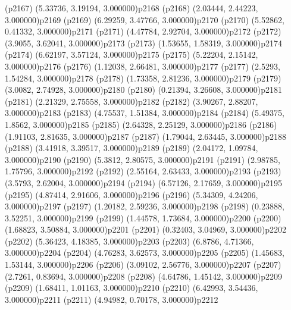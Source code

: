 \psdot(p2167)
\psPoint(5.33736, 3.19194, 3.000000){p2168}
\psdot(p2168)
\psPoint(2.03444, 2.44223, 3.000000){p2169}
\psdot(p2169)
\psPoint(6.29259, 3.47766, 3.000000){p2170}
\psdot(p2170)
\psPoint(5.52862, 0.41332, 3.000000){p2171}
\psdot(p2171)
\psPoint(4.47784, 2.92704, 3.000000){p2172}
\psdot(p2172)
\psPoint(3.9055, 3.62041, 3.000000){p2173}
\psdot(p2173)
\psPoint(1.53655, 1.58319, 3.000000){p2174}
\psdot(p2174)
\psPoint(6.62197, 3.57124, 3.000000){p2175}
\psdot(p2175)
\psPoint(5.22204, 2.15142, 3.000000){p2176}
\psdot(p2176)
\psPoint(1.12038, 2.66481, 3.000000){p2177}
\psdot(p2177)
\psPoint(2.5293, 1.54284, 3.000000){p2178}
\psdot(p2178)
\psPoint(1.73358, 2.81236, 3.000000){p2179}
\psdot(p2179)
\psPoint(3.0082, 2.74928, 3.000000){p2180}
\psdot(p2180)
\psPoint(0.21394, 3.26608, 3.000000){p2181}
\psdot(p2181)
\psPoint(2.21329, 2.75558, 3.000000){p2182}
\psdot(p2182)
\psPoint(3.90267, 2.88207, 3.000000){p2183}
\psdot(p2183)
\psPoint(4.75537, 1.51384, 3.000000){p2184}
\psdot(p2184)
\psPoint(5.49375, 1.8562, 3.000000){p2185}
\psdot(p2185)
\psPoint(2.64328, 2.25129, 3.000000){p2186}
\psdot(p2186)
\psPoint(1.91103, 2.81635, 3.000000){p2187}
\psdot(p2187)
\psPoint(1.79044, 2.63445, 3.000000){p2188}
\psdot(p2188)
\psPoint(3.41918, 3.39517, 3.000000){p2189}
\psdot(p2189)
\psPoint(2.04172, 1.09784, 3.000000){p2190}
\psdot(p2190)
\psPoint(5.3812, 2.80575, 3.000000){p2191}
\psdot(p2191)
\psPoint(2.98785, 1.75796, 3.000000){p2192}
\psdot(p2192)
\psPoint(2.55164, 2.63433, 3.000000){p2193}
\psdot(p2193)
\psPoint(3.5793, 2.62004, 3.000000){p2194}
\psdot(p2194)
\psPoint(6.57126, 2.17659, 3.000000){p2195}
\psdot(p2195)
\psPoint(4.87414, 2.91606, 3.000000){p2196}
\psdot(p2196)
\psPoint(5.34309, 4.24206, 3.000000){p2197}
\psdot(p2197)
\psPoint(1.20182, 2.59236, 3.000000){p2198}
\psdot(p2198)
\psPoint(0.23888, 3.52251, 3.000000){p2199}
\psdot(p2199)
\psPoint(1.44578, 1.73684, 3.000000){p2200}
\psdot(p2200)
\psPoint(1.68823, 3.50884, 3.000000){p2201}
\psdot(p2201)
\psPoint(0.32403, 3.04969, 3.000000){p2202}
\psdot(p2202)
\psPoint(5.36423, 4.18385, 3.000000){p2203}
\psdot(p2203)
\psPoint(6.8786, 4.71366, 3.000000){p2204}
\psdot(p2204)
\psPoint(4.76283, 3.62573, 3.000000){p2205}
\psdot(p2205)
\psPoint(1.45683, 1.53144, 3.000000){p2206}
\psdot(p2206)
\psPoint(3.09102, 2.56776, 3.000000){p2207}
\psdot(p2207)
\psPoint(2.7261, 0.83694, 3.000000){p2208}
\psdot(p2208)
\psPoint(4.64786, 1.45142, 3.000000){p2209}
\psdot(p2209)
\psPoint(1.68411, 1.01163, 3.000000){p2210}
\psdot(p2210)
\psPoint(6.42993, 3.54436, 3.000000){p2211}
\psdot(p2211)
\psPoint(4.94982, 0.70178, 3.000000){p2212}
